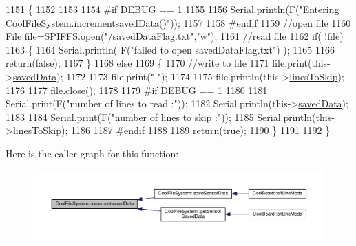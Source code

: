\begin{DoxyCode}
1151 \{
1152 
1153 
1154 \textcolor{preprocessor}{#if DEBUG == 1}
1155     
1156     Serial.println(F(\textcolor{stringliteral}{"Entering CoolFileSystem.incrementsavedData()"}));  
1157     
1158 \textcolor{preprocessor}{#endif}
1159     \textcolor{comment}{//open file}
1160     File file=SPIFFS.open(\textcolor{stringliteral}{"/savedDataFlag.txt"},\textcolor{stringliteral}{"w"});    
1161     \textcolor{comment}{//read file}
1162     \textcolor{keywordflow}{if}( !file)  
1163     \{
1164         Serial.println( F(\textcolor{stringliteral}{"failed to open savedDataFlag.txt"}) );
1165         
1166         \textcolor{keywordflow}{return}(\textcolor{keyword}{false});      
1167     \}
1168     \textcolor{keywordflow}{else}
1169     \{       
1170         \textcolor{comment}{//write to file }
1171         file.print(this->\hyperlink{class_cool_file_system_ad9f5b739a32100f5f21270c3d9ee2b1d}{savedData});
1172         
1173         file.print(\textcolor{stringliteral}{" "});
1174         
1175         file.println(this->\hyperlink{class_cool_file_system_a84fdb6057e534b395512463daa28ea3c}{linesToSkip});
1176     
1177         file.close();
1178 
1179 \textcolor{preprocessor}{    #if DEBUG == 1}
1180 
1181         Serial.print(F(\textcolor{stringliteral}{"number of lines to read :"}));
1182         Serial.println(this->\hyperlink{class_cool_file_system_ad9f5b739a32100f5f21270c3d9ee2b1d}{savedData});
1183     
1184         Serial.print(F(\textcolor{stringliteral}{"number of lines to skip :"}));
1185         Serial.println(this->\hyperlink{class_cool_file_system_a84fdb6057e534b395512463daa28ea3c}{linesToSkip});
1186 
1187 \textcolor{preprocessor}{    #endif}
1188         
1189         \textcolor{keywordflow}{return}(\textcolor{keyword}{true});
1190     \}
1191     
1192 \}
\end{DoxyCode}
Here is the caller graph for this function\+:\nopagebreak
\begin{figure}[H]
\begin{center}
\leavevmode
\includegraphics[width=350pt]{db/d0c/class_cool_file_system_aae045125288f255f3e258073dcada2a6_icgraph}
\end{center}
\end{figure}
\mbox{\label{class_cool_file_system_ac86a40e7c3a1842f7342f698d34324f9}} 
